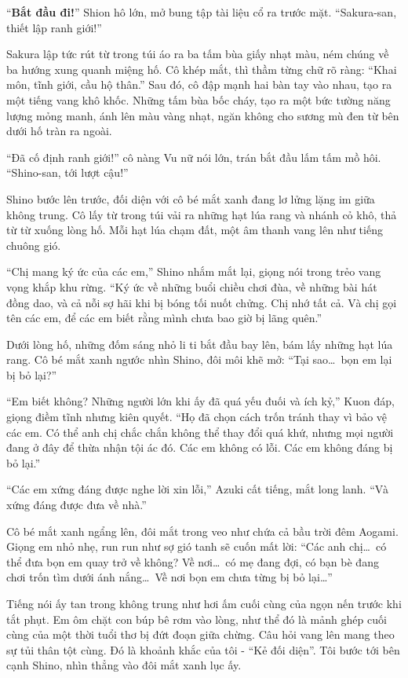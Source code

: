 \documentclass[../main.tex]{subfiles}
\begin{document}
``\textbf{Bắt đầu đi!}'' Shion hô lớn, mở bung tập tài liệu cổ ra trước mặt. ``Sakura-san, thiết lập ranh giới!''

Sakura lập tức rút từ trong túi áo ra ba tấm bùa giấy nhạt màu, ném chúng về ba hướng xung quanh miệng hố. Cô khép mắt, thì thầm từng chữ rõ ràng: ``Khai môn, tĩnh giới, cầu hộ thân.'' Sau đó, cô đập mạnh hai bàn tay vào nhau, tạo ra một tiếng vang khô khốc. Những tấm bùa bốc cháy, tạo ra một bức tường năng lượng mỏng manh, ánh lên màu vàng nhạt, ngăn không cho sương mù đen từ bên dưới hố tràn ra ngoài.

``Đã cố định ranh giới!'' cô nàng Vu nữ nói lớn, trán bắt đầu lấm tấm mồ hôi. ``Shino-san, tới lượt cậu!''

Shino bước lên trước, đối diện với cô bé mắt xanh đang lơ lửng lặng im giữa không trung. Cô lấy từ trong túi vải ra những hạt lúa rang và nhánh cỏ khô, thả từ từ xuống lòng hố. Mỗi hạt lúa chạm đất, một âm thanh vang lên như tiếng chuông gió.

``Chị mang ký ức của các em,'' Shino nhắm mắt lại, giọng nói trong trẻo vang vọng khắp khu rừng. ``Ký ức về những buổi chiều chơi đùa, về những bài hát đồng dao, và cả nỗi sợ hãi khi bị bóng tối nuốt chửng. Chị nhớ tất cả. Và chị gọi tên các em, để các em biết rằng mình chưa bao giờ bị lãng quên.''

Dưới lòng hố, những đốm sáng nhỏ li ti bắt đầu bay lên, bám lấy những hạt lúa rang. Cô bé mắt xanh ngước nhìn Shino, đôi môi khẽ mở: ``Tại sao\dots\ bọn em lại bị bỏ lại?''

``Em biết không? Những người lớn khi ấy đã quá yếu đuối và ích kỷ,'' Kuon đáp, giọng điềm tĩnh nhưng kiên quyết. ``Họ đã chọn cách trốn tránh thay vì bảo vệ các em. Có thể anh chị chắc chắn không thể thay đổi quá khứ, nhưng mọi người đang ở đây để thừa nhận tội ác đó. Các em không có lỗi. Các em không đáng bị bỏ lại.''

``Các em xứng đáng được nghe lời xin lỗi,'' Azuki cất tiếng, mắt long lanh. ``Và xứng đáng được đưa về nhà.''

Cô bé mắt xanh ngẩng lên, đôi mắt trong veo như chứa cả bầu trời đêm Aogami. Giọng em nhỏ nhẹ, run run như sợ gió tanh sẽ cuốn mất lời: ``Các anh chị\dots\ có thể đưa bọn em quay trở về không? Về nơi\dots\ có mẹ đang đợi, có bạn bè đang chơi trốn tìm dưới ánh nắng\dots\ Về nơi bọn em chưa từng bị bỏ lại\dots''

Tiếng nói ấy tan trong không trung như hơi ấm cuối cùng của ngọn nến trước khi tắt phụt. Em ôm chặt con búp bê rơm vào lòng, như thể đó là mảnh ghép cuối cùng của một thời tuổi thơ bị đứt đoạn giữa chừng. Câu hỏi vang lên mang theo sự tủi thân tột cùng. Đó là khoảnh khắc của tôi - ``Kẻ đối diện''. Tôi bước tới bên cạnh Shino, nhìn thẳng vào đôi mắt xanh lục ấy.
\end{document}
